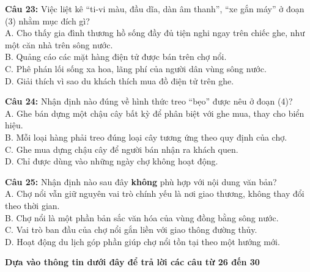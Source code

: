 \documentclass[12pt,a4paper]{article}
\begin{document}


\vspace{0.3cm}

\noindent \textbf{Câu 23:} Việc liệt kê ``ti-vi màu, đầu dĩa, dàn âm thanh'', ``xe gắn máy'' ở đoạn (3) nhằm mục đích gì?\\
\noindent A. Cho thấy gia đình thương hồ sống đầy đủ tiện nghi ngay trên chiếc ghe, như một căn nhà trên sông nước.\\
\noindent B. Quảng cáo các mặt hàng điện tử được bán trên chợ nổi.\\
\noindent C. Phê phán lối sống xa hoa, lãng phí của người dân vùng sông nước.\\
\noindent D. Giải thích vì sao du khách thích mua đồ điện tử trên ghe.



\vspace{0.3cm}

\noindent \textbf{Câu 24:} Nhận định nào đúng về hình thức treo ``bẹo'' được nêu ở đoạn (4)?\\
\noindent A. Ghe bán dựng một chậu cây bất kỳ để phân biệt với ghe mua, thay cho biển hiệu.\\
\noindent B. Mỗi loại hàng phải treo đúng loại cây tương ứng theo quy định của chợ.\\
\noindent C. Ghe mua dựng chậu cây để người bán nhận ra khách quen.\\
\noindent D. Chỉ được dùng vào những ngày chợ không hoạt động.



\vspace{0.3cm}

\noindent \textbf{Câu 25:} Nhận định nào sau đây \textbf{không} phù hợp với nội dung văn bản?\\
\noindent A. Chợ nổi vẫn giữ nguyên vai trò chính yếu là nơi giao thương, không thay đổi theo thời gian.\\
\noindent B. Chợ nổi là một phần bản sắc văn hóa của vùng đồng bằng sông nước.\\
\noindent C. Vai trò ban đầu của chợ nổi gắn liền với giao thông đường thủy.\\
\noindent D. Hoạt động du lịch góp phần giúp chợ nổi tồn tại theo một hướng mới.



\vspace{0.5cm}
\noindent\textbf{Dựa vào thông tin dưới đây để trả lời các câu từ 26 đến 30}%
\end{document}
